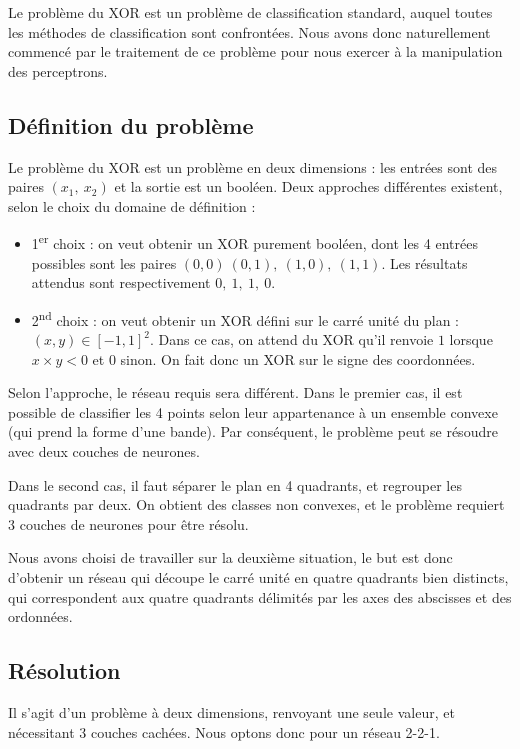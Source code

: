 Le problème du XOR est un problème de classification standard, auquel toutes les méthodes de classification sont confrontées. Nous avons donc naturellement commencé par le traitement de ce problème pour nous exercer à la manipulation des perceptrons.

\subsection{Définition du problème}

Le problème du XOR est un problème en deux dimensions : les entrées sont des paires $(x_1,\ x_2)$ et la sortie est un booléen. Deux approches différentes existent, selon le choix du domaine de définition : 

\begin{itemize}
  \item 1\textsuperscript{er} choix : on veut obtenir un XOR purement booléen, dont les 4 entrées possibles sont les paires $(0,0)\ (0,1),\ (1,0),\ (1,1)$. Les résultats attendus sont respectivement $0,\ 1,\ 1,\ 0$.
  \item 2\textsuperscript{nd} choix : on veut obtenir un XOR défini sur le carré unité du plan : ${(x,y) \in [-1,1]^2}$. Dans ce cas, on attend du XOR qu'il renvoie $1$ lorsque $x \times y < 0$ et $0$ sinon. On fait donc un XOR sur le signe des coordonnées.
\end{itemize}

Selon l'approche, le réseau requis sera différent. Dans le premier cas, il est possible de classifier les 4 points selon leur appartenance à un ensemble convexe (qui prend la forme d'une bande). Par conséquent, le problème peut se résoudre avec deux couches de neurones.

Dans le second cas, il faut séparer le plan en 4 quadrants, et regrouper les quadrants par deux. On obtient des classes non convexes, et le problème requiert 3 couches de neurones pour être résolu.

Nous avons choisi de travailler sur la deuxième situation, le but est donc d'obtenir un réseau qui découpe le carré unité en quatre quadrants bien distincts, qui correspondent aux quatre quadrants délimités par les axes des abscisses et des ordonnées.

\subsection{Résolution}

Il s'agit d'un problème à deux dimensions, renvoyant une seule valeur, et nécessitant 3 couches cachées. Nous optons donc pour un réseau 2-2-1. 

